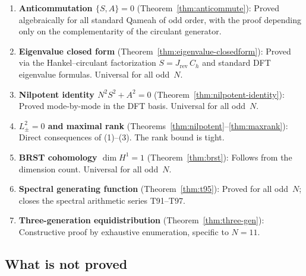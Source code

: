 \documentclass[aip,jmp,reprint,superscriptaddress,floatfix,nofootinbib]{revtex4-2}
\theoremstyle{definition}
\theoremstyle{remark}
\begin{document}
\begin{enumerate}
\item \textbf{Anticommutation $\{S,A\}=0$}
      (Theorem~\ref{thm:anticommute}): Proved algebraically for
      all standard Qameah of odd order, with the proof
      depending only on the complementarity of the circulant generator.

\item \textbf{Eigenvalue closed form}
      (Theorem~\ref{thm:eigenvalue-closedform}): Proved via the
      Hankel--circulant factorization $S = J_{\mathrm{rev}}\,C_h$ and
      standard DFT eigenvalue formulas.  Universal for all odd~$N$.

\item \textbf{Nilpotent identity $N^2S^2 + A^2 = 0$}
      (Theorem~\ref{thm:nilpotent-identity}): Proved mode-by-mode in
      the DFT basis.  Universal for all odd~$N$.

\item \textbf{$L_\pm^2 = 0$ and maximal rank}
      (Theorems~\ref{thm:nilpotent}--\ref{thm:maxrank}): Direct
      consequences of (1)--(3).  The rank bound is tight.

\item \textbf{BRST cohomology $\dim H^1 = 1$}
      (Theorem~\ref{thm:brst}): Follows from the dimension count.
      Universal for all odd~$N$.

\item \textbf{Spectral generating function}
      (Theorem~\ref{thm:t95}): Proved for all odd~$N$; closes the
      spectral arithmetic series T91--T97.

\item \textbf{Three-generation equidistribution}
      (Theorem~\ref{thm:three-gen}): Constructive proof by exhaustive
      enumeration, specific to $N{=}11$.
\end{enumerate}

\subsection{What is not proved}
\end{document}
